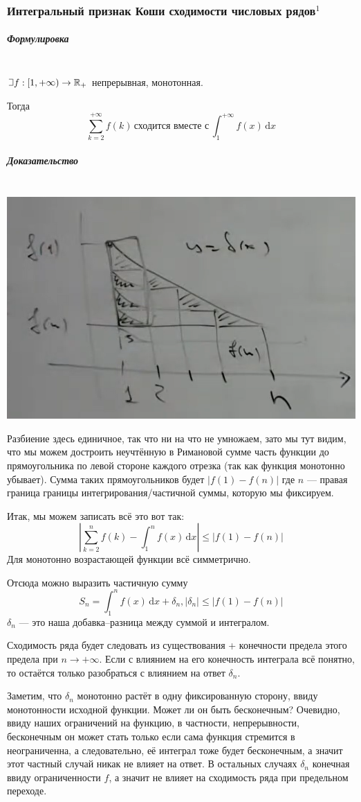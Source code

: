 \documentclass{article}
\def\letus{%
\mathord{\setbox0=\hbox{$\exists$}%
         \hbox{\kern 0.125\wd0%
               \vbox to \ht0{%
                  \hrule width 0.75\wd0%
                  \vfill%
                  \hrule width 0.75\wd0}%
               \vrule height \ht0%
               \kern 0.125\wd0}%
       }%
        }
\def\D{\,\mathrm{d}}
\let\vanillasubparagraph\subparagraph
\renewcommand{\subparagraph}[1]{\vanillasubparagraph{#1}\mbox{}\\}
\begin{document}
\subsubsection{Интегральный признак Коши сходимости числовых рядов\texorpdfstring{$^1$}{}}
\subparagraph{Формулировка}
$\letus f: [1, +\infty) \rightarrow \mathbb{R}_+$ непрерывная, монотонная.

Тогда
$$
\sum_{k=2}^{+\infty} f(k) \,\text{сходится вместе с}\, \int_1^{+\infty}f(x)\D x
$$

\subparagraph{Доказательство}
\includegraphics[]{../images/intkoshi.png}

Разбиение здесь единичное, так что ни на что не умножаем, зато мы тут видим, что мы можем достроить неучтённую в Римановой сумме часть функции до прямоугольника по левой стороне каждого отрезка (так как функция монотонно убывает). Сумма таких прямоугольников будет $|f(1) - f(n)|$ где $n$ --- правая граница границы интегрирования/частичной суммы, которую мы фиксируем.

Итак, мы можем записать всё это вот так:
$$
\left| \sum_{k=2}^n f(k) - \int_1^n f(x) \D x \right| \le |f(1) - f(n)|
$$
Для монотонно возрастающей функции всё симметрично.

Отсюда можно выразить частичную сумму
$$
S_n = \int_1^n f(x) \D x + \delta_n, |\delta_n| \le |f(1) - f(n)|
$$
$\delta_n$ --- это наша добавка--разница между суммой и интегралом.

Сходимость ряда будет следовать из существования + конечности предела этого предела при $n\rightarrow +\infty$. Если с влиянием на его конечность интеграла всё понятно, то остаётся только разобраться с влиянием на ответ $\delta_n$.

Заметим, что $\delta_n$ монотонно растёт в одну фиксированную сторону, ввиду монотонности исходной функции. Может ли он быть бесконечным? Очевидно, ввиду наших ограничений на функцию, в частности, непрерывности, бесконечным он может стать только если сама функция стремится в неограниченна, а следовательно, её интеграл тоже будет бесконечным, а значит этот частный случай никак не влияет на ответ. В остальных случаях $\delta_n$ конечная ввиду ограниченности $f$, а значит не влияет на сходимость ряда при предельном переходе.
\end{document}

